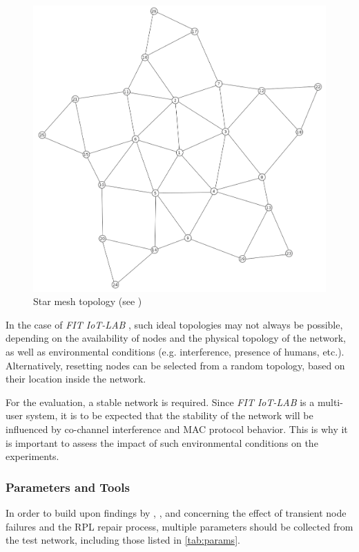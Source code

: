 \documentclass[
  a4paper,
  11pt,
  style=screen,
  extramargin,
  bcor=10mm,
  rgb,
  hyperrefdark,
  abstract=off,
  lnum,
]{tubsartcl}
\newcommand{\fitlab}{\emph{FIT IoT-LAB} }
\begin{document}
\begin{figure}[h]
  \centering
  \includegraphics[width=.5\textwidth]{../images/starmesh.png}
  \caption{Star mesh topology (see \cite{mueller2017})}
  \label{fig:meshstar}
\end{figure}

In the case of \fitlab, such ideal topologies may not always be possible, depending on the availability of nodes and the physical topology of the network, as well as environmental conditions (e.g. interference, presence of humans, etc.).
Alternatively, resetting nodes can be selected from a random topology, based on their location inside the network.

For the evaluation, a stable network is required.
Since \fitlab is a multi-user system, it is to be expected that the stability of the network will be influenced by co-channel interference and \ac{MAC} protocol behavior.
This is why it is important to assess the impact of such environmental conditions on the experiments.

\subsubsection{Parameters and Tools}

In order to build upon findings by \cite{kulau2017energy}, \cite{gaddour2014co}, \cite{accettura2011performance} and \cite{ali2012performance} concerning the effect of transient node failures and the \ac{RPL} repair process, multiple parameters should be collected from the test network, including those listed in \autoref{tab:params}.
\end{document}
